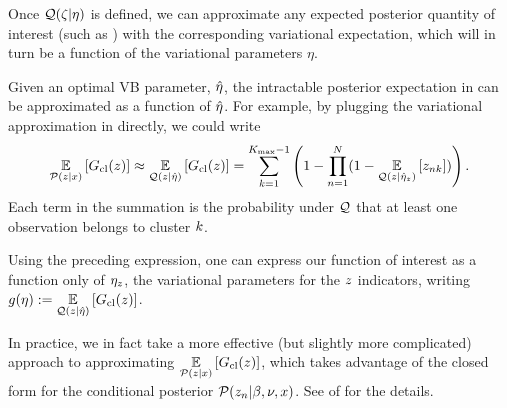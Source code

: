Once $\mathcal{Q}(\zeta \vert \eta)$ is defined,
we can approximate any expected posterior quantity of interest
(such as ) with the
corresponding variational expectation, which will
in turn be a function of the variational parameters $\eta$.

\begin{ex}
%
Given an optimal VB parameter, $\hat\eta$, the intractable posterior expectation
in  can be approximated as a function of
$\hat\eta$.  For example, by plugging the variational approximation in directly,
we could write
%
\begin{align*}
%
\expect{\p(\z\vert\x)}{\nclusters(\z)} \approx
\expect{\q(\z\vert\etaopt)}{\nclusters(\z)} =
\sumkm \left(1 -  \prod_{\n=1}^\N
    (1 - \expect{\q(\z \vert \etaoptz)}{\z_{\n\k}})\right).
%
\end{align*}
%
Each term in the summation is the probability under $\mathcal{Q}$ that at least
one observation belongs to cluster $k$.

Using the preceding expression, one can express our function of interest as a
function only of $\eta_z$, the variational parameters for the $z$ indicators,
writing $g(\eta) := \underset{\mathcal{Q}(z\vert\hat\eta)}{\mathbb{E}}\left[G_{\text{cl}}(z)\right]$.

In practice, we in fact take a more effective (but slightly more complicated)
approach to approximating $\underset{\mathcal{P}(z\vert x)}{\mathbb{E}}\left[G_{\text{cl}}(z)\right]$, which
takes advantage of the closed form for the conditional posterior $\mathcal{P}(z_n \vert
\beta, \nu, x)$.  See  of
 for the details.
%
\end{ex}
